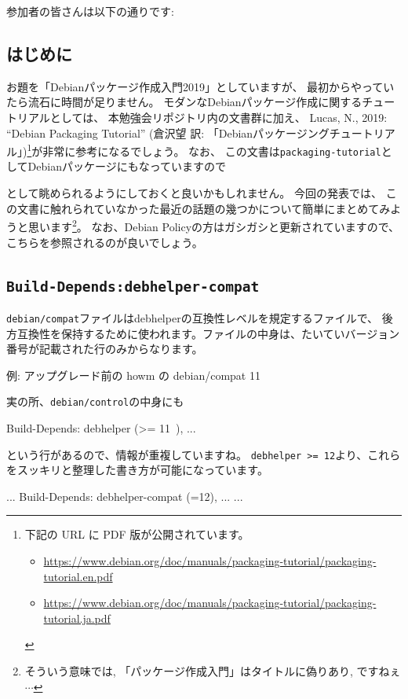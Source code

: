\documentclass[mingoth,a4paper]{jsarticle}
\begin{document}

参加者の皆さんは以下の通りです:
\begin{prework}{}
\end{prework}


\vspace*{-2em}
\subsection{はじめに}

お題を「Debianパッケージ作成入門2019」としていますが、
最初からやっていたら流石に時間が足りません。
%
モダンなDebianパッケージ作成に関するチュートリアルとしては、
本勉強会リポジトリ内の文書群に加え、
Lucas, N., 2019: ``Debian Packaging Tutorial'' (倉沢望 訳: 「Debianパッケージングチュートリアル」)\footnote{%
  下記の URL に PDF 版が公開されています。
  \begin{itemize}[itemsep=0pt,topsep=0pt]
  \item %
    \url{https://www.debian.org/doc/manuals/packaging-tutorial/packaging-tutorial.en.pdf}
  \item %
    \url{https://www.debian.org/doc/manuals/packaging-tutorial/packaging-tutorial.ja.pdf}
  \end{itemize}
}が非常に参考になるでしょう。
なお、
この文書は\texttt{packaging-tutorial}としてDebianパッケージにもなっていますので
\begin{commandline}
\end{commandline}
として眺められるようにしておくと良いかもしれません。
%
今回の発表では、
この文書に触れられていなかった最近の話題の幾つかについて簡単にまとめてみようと思います\footnote{%
  そういう意味では, 「パッケージ作成入門」はタイトルに偽りあり, ですねぇ$\cdots$%
}。
なお、Debian Policyの方はガシガシと更新されていますので、こちらを参照されるのが良いでしょう。

\subsection{\texttt{Build-Depends:debhelper-compat}}

\texttt{debian/compat}ファイルはdebhelperの互換性レベルを規定するファイルで、
後方互換性を保持するために使われます。ファイルの中身は、たいていバージョン番号が記載された行のみからなります。
\begin{commandline}
  例: アップグレード前の howm の debian/compat
  11
\end{commandline}
\noindent
実の所、\texttt{debian/control}の中身にも
\begin{commandline}
  Build-Depends: debhelper (>= 11~), ...
\end{commandline}
\noindent
という行があるので、情報が重複していますね。
%
\texttt{debhelper >= 12}より、これらをスッキリと整理した書き方が可能になっています。
\begin{commandline}
  ...
  Build-Depends: debhelper-compat (=12), ...
  ...
\end{commandline}
\end{document}
